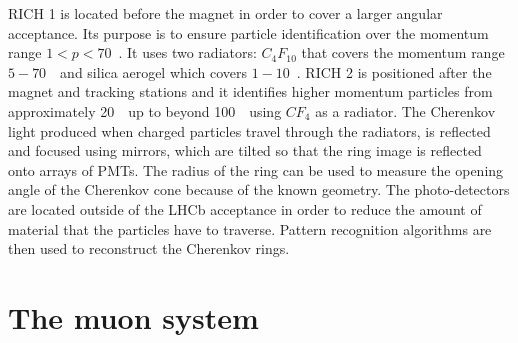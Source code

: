 RICH 1 is located before the magnet in order to cover a larger angular acceptance. Its purpose is to ensure
particle identification over the momentum range \mbox{$1 < p < 70$~\gevc}. It uses two radiators: $C_4F_{10}$ that covers
the momentum range $5-70$~\gevc~and silica aerogel which covers $1-10$~\gevc. RICH 2 is positioned after
the magnet and tracking stations and it identifies higher momentum particles from approximately 20~\gevc~up to beyond
100~\gevc~using $CF_4$ as a radiator.
The Cherenkov light produced when charged particles travel through the radiators, is reflected and focused using
mirrors, which are tilted so that the ring image is reflected onto arrays of PMTs.
The radius of the ring can be used to measure the opening angle of the Cherenkov cone because of the known geometry.
The photo-detectors are located outside of the LHCb acceptance in order to reduce the amount of material that
the particles have to traverse. Pattern recognition algorithms are then used to reconstruct the Cherenkov rings.



\section{The muon system}

